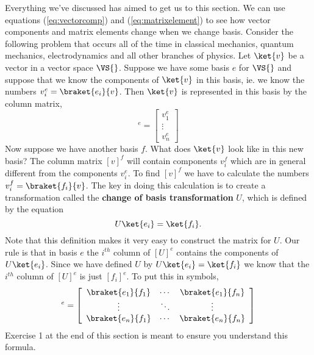 Everything we've discussed has aimed to get us to this section.  We can use equations (\ref{eq:vectorcomp}) and (\ref{eq:matrixelement}) to see how vector components and matrix elements change when we change basis.  Consider the following problem that occurs all of the time in classical mechanics, quantum mechanics, electrodynamics and all other branches of physics.  Let $\ket{v}$ be a vector in a vector space $\VS{}$.  Suppose we have some basis $e$ for $\VS{}$ and suppose that we know the components of $\ket{v}$ in this basis, ie. we know the numbers $v^e_i = \braket{e_i}{v}$.  Then $\ket{v}$ is represented in this basis by the column matrix,
\begin{displaymath}
[v]^e = \left[ \begin{array}{c} v^e_1 \\ \vdots \\ v^e_n \end{array} \right] \end{displaymath}
Now suppose we have another basis $f$.  What does $\ket{v}$ look like in this new basis?  The column matrix $[v]^f$ will contain components $v_i^f$ which are in general different from the components $v_i^e$.  To find $[v]^f$ we have to calculate the numbers $v^f_i = \braket{f_i}{v}$.  The key in doing this calculation is to create a transformation called the \textbf{change of basis transformation} $U$, which is defined by the equation
\begin{displaymath} U\ket{e_i} = \ket{f_i}. \end{displaymath}
Note that this definition makes it very easy to construct the matrix for $U$.  Our rule is that in basis $e$ the $i^{th}$ column of $[U]^e$ contains the components of $U\ket{e_i}$.  Since we have defined $U$ by $U\ket{e_i} = \ket{f_i}$ we know that the $i^{th}$ column of $[U]^e$ is just $[f_i]^e$. To put this in symbols,
\begin{displaymath}
[U]^e = \left[ \begin{array}{ccc} \braket{e_1}{f_1} & \cdots & \braket{e_1}{f_n} \\ \vdots & \ddots & \vdots \\ \braket{e_n}{f_1} & \cdots & \braket{e_n}{f_n} \end{array} \right]
\end{displaymath}
Exercise 1 at the end of this section is meant to ensure you understand this formula.


